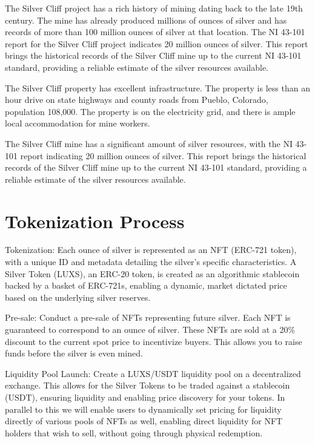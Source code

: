 \documentclass[11pt]{article}
\begin{document}
The Silver Cliff project has a rich history of mining dating back to the late 19th century. The mine has already produced millions of ounces of silver and has records of more than 100 million ounces of silver at that location. The NI 43-101 report for the Silver Cliff project indicates 20 million ounces of silver. This report brings the historical records of the Silver Cliff mine up to the current NI 43-101 standard, providing a reliable estimate of the silver resources available.


The Silver Cliff property has excellent infrastructure. The property is less than an hour drive on state highways and county roads from Pueblo, Colorado, population 108,000. The property is on the electricity grid, and there is ample local accommodation for mine workers.


The Silver Cliff mine has a significant amount of silver resources, with the NI 43-101 report indicating 20 million ounces of silver. This report brings the historical records of the Silver Cliff mine up to the current NI 43-101 standard, providing a reliable estimate of the silver resources available.


\section{Tokenization Process}

Tokenization: Each ounce of silver is represented as an NFT (ERC-721 token), with a unique ID and metadata detailing the silver's specific characteristics. A Silver Token (LUXS), an ERC-20 token, is created as an algorithmic stablecoin backed by a basket of ERC-721s, enabling a dynamic, market dictated price based on the underlying silver reserves.


Pre-sale: Conduct a pre-sale of NFTs representing future silver. Each NFT is guaranteed to correspond to an ounce of silver. These NFTs are sold at a 20\% discount to the current spot price to incentivize buyers. This allows you to raise funds before the silver is even mined.


Liquidity Pool Launch: Create a LUXS/USDT liquidity pool on a decentralized exchange. This allows for the Silver Tokens to be traded against a stablecoin (USDT), ensuring liquidity and enabling price discovery for your tokens. In parallel to this we will enable users to dynamically set pricing for liquidity directly of various pools of NFTs as well, enabling direct liquidity for NFT holders that wish to sell, without going through physical redemption.
\end{document}
